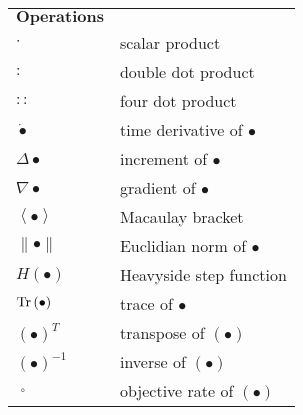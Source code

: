 \begin{table}[htb]
  \centering
    \begin{tabular}{p{3cm}p{10.5cm}}
    $\textbf{Operations}$ & \\
    $\cdot$  & scalar product \\
    $:$  & double dot product \\
    $::$  & four dot product \\
    ${\dot  \bullet }$  & time derivative of $\bullet$ \\
    ${\Delta  \bullet }$  & increment of $\bullet$ \\
    $\nabla \bullet$  & gradient of $\bullet$ \\
    $\left\langle  \bullet  \right\rangle$  & Macaulay bracket \\
    $\left\|  \bullet  \right\|$  & Euclidian norm of $\bullet$ \\
    $H\left(  \bullet  \right)$  & Heavyside step function \\
    $\rm{Tr}\left(  \bullet  \right)$  & trace of $\bullet$ \\
    ${\left(  \bullet  \right)^T}$  & transpose of $\left(  \bullet  \right)$ \\
    ${\left(  \bullet  \right)^{ - 1}}$  & inverse of $\left(  \bullet  \right)$ \\
    $\mathop {\left(  \bullet  \right)}\limits^ \circ$  & objective rate of $\left(  \bullet  \right)$ \\
    \end{tabular}%
  \label{Tab:operations}%
\end{table}%
\renewcommand\arraystretch{1.0}